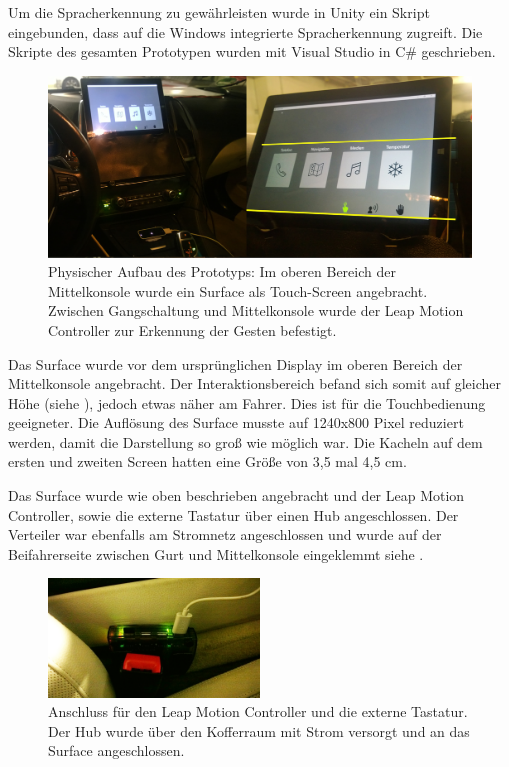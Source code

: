 Um die Spracherkennung zu gewährleisten wurde in Unity ein Skript eingebunden, dass auf die Windows integrierte Spracherkennung zugreift. 
Die Skripte des gesamten Prototypen wurden mit Visual Studio in C\# geschrieben.

\begin{figure}[ht]
  \centering
  \includegraphics[width=1\textwidth]{img/AutoSetting3.jpg}
  \caption{Physischer Aufbau des Prototyps: Im oberen Bereich der Mittelkonsole wurde ein
Surface als Touch-Screen angebracht. Zwischen Gangschaltung und Mittelkonsole wurde der Leap Motion Controller zur Erkennung der Gesten befestigt.}
  \label{fig:AnbringungSurface}
\end{figure} 
Das Surface wurde vor dem ursprünglichen Display im oberen Bereich der Mittelkonsole angebracht. 
Der Interaktionsbereich befand sich somit auf gleicher Höhe (siehe ), jedoch etwas näher am Fahrer.
Dies ist für die Touchbedienung geeigneter. 
Die Auflösung des Surface musste auf 1240x800 Pixel reduziert werden, damit die Darstellung so groß wie möglich war. 
Die Kacheln auf dem ersten und zweiten Screen hatten eine Größe von 3,5 mal 4,5 cm.  

Das Surface wurde wie oben beschrieben angebracht und der Leap Motion Controller, sowie die externe Tastatur über einen Hub angeschlossen. 
Der Verteiler war ebenfalls am Stromnetz angeschlossen und wurde auf der Beifahrerseite zwischen Gurt und Mittelkonsole eingeklemmt siehe . 
\begin{figure}[ht]
  \centering
  \includegraphics[width=0.5\textwidth]{img/Hub.jpg}
  \caption[Anschluss für den Leap Motion Controller und die externe Tastatur]{Anschluss für den Leap Motion Controller und die externe Tastatur. Der Hub wurde über den Kofferraum mit Strom versorgt und an das Surface angeschlossen. }
  \label{fig:Hub}
\end{figure} 

